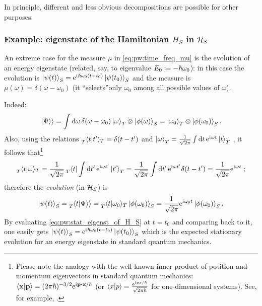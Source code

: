 In principle, different and less obvious decompositions are possible for other purposes.

\subsubsection{Example: eigenstate of the Hamiltonian $H_S$ in $\mathcal{H}_S$}

An extreme case for the measure $\mu$ in \eqref{eq:pw:time_freq_mu}
is the evolution of an energy eigenstate
(related, say, to eigenvalue $E_0 \coloneqq -\hbar\omega_{0}$): in this case the evolution is
$\ket{\psi(t)}_{S} = \mathrm{e}^{\mathrm{i}\mkern1mu\hbar\omega_{0}(t-t_{0})} \ket{\psi(t_0)}_{S}$
and
the measure is
$\mu(\omega) = \delta(\omega-\omega_0)$
(it  ``selects''only $\omega_0$ among all possible values
of $\omega$).

Indeed:
\[
  \left.\left| \Psi \right\rangle\right\rangle = \int \dd{\omega} \delta(\omega-\omega_0)\ket{\omega}_T \otimes \ket{\phi(\omega)}_S =
    \ket{\omega_0}_T \otimes \ket{\phi(\omega_0)}_S \text{.}
\]
Also, using the relations
$
\prescript{}{T}{\braket{t}{t'}}_T = \delta(t-t')
$
and
$
  \ket{\omega}_T =
  \frac{1}{\sqrt{2\pi}} \int\dd{t}\mathrm{e}^{\mathrm{i}\mkern1mu\omega t}\ket{t}_T
$
\parencite{Lloyd:Time},
it follows that\footnote{%
  Please note the analogy with the well-known
  inner product of position and momentum eigenvectors in standard quantum mechanics:
  $\braket{\vb{x}}{\vb{p}} = (2\pi\hbar)^{-3/2}\E^{\iu \vb{p} \vdot \vb{x}  / \hbar}$
  (or $\braket{x}{p} = \frac{\mathrm{e}^{\mathrm{i}\mkern1mu p x / \hbar}}{\sqrt{2\pi\hbar}}$ for one-dimensional systems).
  See, for example, \cite[126--127]{Ballentine}.
}
\[
  \prescript{}{T}{\braket{t}{\omega}}_T =
  \frac{1}{\sqrt{2\pi}}\prescript{}{T}{\bra{t}} \int\dd{t'}\mathrm{e}^{\mathrm{i}\mkern1mu\omega t'}\ket{t'}_T  =
  \frac{1}{\sqrt{2\pi}}\int\dd{t'}\mathrm{e}^{\mathrm{i}\mkern1mu\omega t'}\delta(t-t') =
  \frac{1}{\sqrt{2\pi}} \mathrm{e}^{\mathrm{i}\mkern1mu\omega t} \; \text{;}
\]
therefore the \emph{evolution} (in $\mathcal{H}_S$) is
\begin{equation}
  \ket{\psi(t)}_S = \prescript{}{T}{\!\left.\left\langle t \middle| \Psi \right\rangle\right\rangle} = \prescript{}{T}{\braket{t}{\omega_0}}_{T} \ket{\phi(\omega_0)}_S =
    \frac{1}{\sqrt{2\pi}} \mathrm{e}^{\mathrm{i}\mkern1mu\omega_0 t} \ket{\phi(\omega_0)}_S \text{.}
\label{eq:pw:stat_eigenst_of_H_S}
\end{equation}
By evaluating \eqref{eq:pw:stat_eigenst_of_H_S} at $t=t_0$ and comparing back to it,
one easily gets
$\ket{\psi(t)}_{S} = \mathrm{e}^{\mathrm{i}\mkern1mu\hbar\omega_{0}(t-t_{0})} \ket{\psi(t_0)}_{S}$
which is the expected stationary evolution for an energy eigenstate in standard quantum mechanics. 






